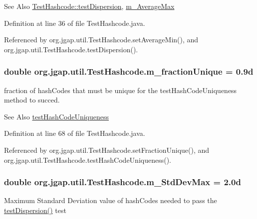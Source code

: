 \begin{DoxySeeAlso}{See Also}
\hyperlink{classorg_1_1jgap_1_1util_1_1_test_hashcode_a08e541143a78fdf8902cedac17e1f65d}{Test\-Hashcode\-::test\-Dispersion}, \hyperlink{classorg_1_1jgap_1_1util_1_1_test_hashcode_a0d91cff36298abbb9761e0a864b79df9}{m\-\_\-\-Average\-Max} 
\end{DoxySeeAlso}


Definition at line 36 of file Test\-Hashcode.\-java.



Referenced by org.\-jgap.\-util.\-Test\-Hashcode.\-set\-Average\-Min(), and org.\-jgap.\-util.\-Test\-Hashcode.\-test\-Dispersion().

\hypertarget{classorg_1_1jgap_1_1util_1_1_test_hashcode_aae2f2be35f516f8a9f75141267f43d49}{
\subsubsection[{m\-\_\-fraction\-Unique}]{\setlength{\rightskip}{0pt plus 5cm}double org.\-jgap.\-util.\-Test\-Hashcode.\-m\-\_\-fraction\-Unique = 0.\-9d\hspace{0.3cm}{\ttfamily [private]}}}\label{classorg_1_1jgap_1_1util_1_1_test_hashcode_aae2f2be35f516f8a9f75141267f43d49}
fraction of hash\-Codes that must be unique for the test\-Hash\-Code\-Uniqueness method to succed.

\begin{DoxySeeAlso}{See Also}
\hyperlink{classorg_1_1jgap_1_1util_1_1_test_hashcode_a8b64668c1d3ab567efb816ac2ed597e9}{test\-Hash\-Code\-Uniqueness} 
\end{DoxySeeAlso}


Definition at line 68 of file Test\-Hashcode.\-java.



Referenced by org.\-jgap.\-util.\-Test\-Hashcode.\-set\-Fraction\-Unique(), and org.\-jgap.\-util.\-Test\-Hashcode.\-test\-Hash\-Code\-Uniqueness().

\hypertarget{classorg_1_1jgap_1_1util_1_1_test_hashcode_a8c500454e1a3728534cc3c0c5f848b52}{
\subsubsection[{m\-\_\-\-Std\-Dev\-Max}]{\setlength{\rightskip}{0pt plus 5cm}double org.\-jgap.\-util.\-Test\-Hashcode.\-m\-\_\-\-Std\-Dev\-Max = 2.\-0d\hspace{0.3cm}{\ttfamily [private]}}}\label{classorg_1_1jgap_1_1util_1_1_test_hashcode_a8c500454e1a3728534cc3c0c5f848b52}
Maximum Standard Deviation value of hash\-Codes needed to pass the \hyperlink{classorg_1_1jgap_1_1util_1_1_test_hashcode_a08e541143a78fdf8902cedac17e1f65d}{test\-Dispersion()} test

